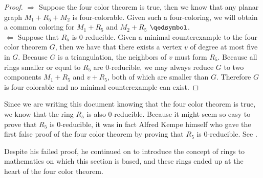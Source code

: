 \begin{proof}
\hfill\newline
$\Longrightarrow$ Suppose the four color theorem is true, then we know that any planar graph $M_1 + R_5 + M_2$ is four-colorable. Given such a four-coloring, we will obtain a common coloring for $M_1+R_5$ and $M_2+R_5$ $\qedsymbol$.\\
$\Longleftarrow$ Suppose that $R_5$ is 0-reducible. Given a minimal counterexample to the four color theorem $G$, then we have that there exists a vertex $v$ of degree at most five in $G$. Because $G$ is a triangulation, the neighbors of $v$ must form $R_5$. Because all rings smaller or equal to $R_5$ are 0-reducible, we may always reduce $G$ to two components $M_1+R_5$ and $v+R_5$, both of which are smaller than $G$. Therefore $G$ is four colorable and no minimal counterexample can exist.
\end{proof}

Since we are writing this document knowing that the four color theorem is true, we know that the ring $R_5$ is also 0-reducible. Because it might seem so easy to prove that $R_5$ is 0-reducible, it was in fact Alfred Kempe himself who gave the first false proof of the four color theorem by proving that $R_5$ is 0-reducible. See \cite{kempe}.

Despite his failed proof, he continued on to introduce the concept of rings to mathematics on which this section is based, and these rings ended up at the heart of the four color theorem.